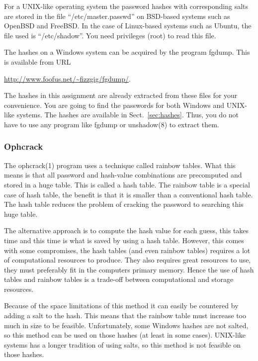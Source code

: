 For a UNIX-like operating system the password hashes with corresponding salts 
are stored in the file \enquote{/etc/master.passwd} on BSD-based systems such 
as OpenBSD and FreeBSD\@.
In the case of Linux-based systems such as Ubuntu, the file used is 
\enquote{/etc/shadow}.
You need privileges (root) to read this file.

The hashes on a Windows system can be acquired by the program fgdump.
This is available from URL
\begin{center}
  \url{http://www.foofus.net/~fizzgig/fgdump/}.
\end{center}

The hashes in this assignment are already extracted from these files for your 
convenience.
You are going to find the passwords for both Windows and UNIX-like systems.
The hashes are available in Sect.~\ref{sec:hashes}.
Thus, you do not have to use any program like fgdump or unshadow(8) to extract 
them.

\subsubsection{Ophcrack}

The ophcrack(1) program uses a technique called rainbow tables.
What this means is that all password and hash-value combinations are 
precomputed and stored in a huge table.
This is called a hash table.
The rainbow table is a special case of hash table, the benefit is that it is 
smaller than a conventional hash table.
The hash table reduces the problem of cracking the password to searching this 
huge table.

The alternative approach is to compute the hash value for each guess, this 
takes time and this time is what is saved by using a hash table.
However, this comes with some compromises, the hash tables (and even rainbow 
tables) requires a lot of computational resources to produce.
They also requires great resources to use, they must preferably fit in the 
computers primary memory.
Hence the use of hash tables and rainbow tables is a trade-off between 
computational and storage resources.

Because of the space limitations of this method it can easily be countered by 
adding a salt to the hash.
This means that the rainbow table must increase too much in size to be 
feasible.
Unfortunately, some Windows hashes are not salted, so this method can be used 
on those hashes (at least in some cases).
UNIX-like systems has a longer tradition of using salts, so this method is not 
feasible on those hashes.

